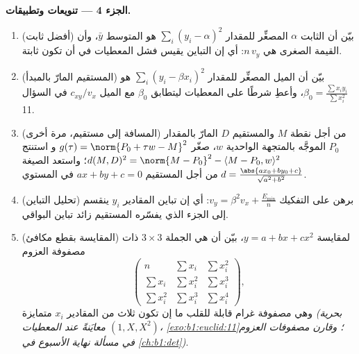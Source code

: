 \begin{problem}
\medskip
\noindent\textbf{الجزء 4 --- تنويعات وتطبيقات.}
\begin{enumerate}[resume]
  \item (أفضل ثابت) بيّن أن الثابت $\alpha$
        المصغِّر للمقدار $\sum_i (y_i - \alpha)^2$ هو المتوسط $\bar
        y$، وأن القيمة الصغرى هي $n\,v_y$: أي إن التباين
        يقيس فشل المعطيات في أن تكون ثابتة.
  \item (المستقيم المارّ بالمبدأ) بيّن أن الميل المصغِّر للمقدار
        $\sum_i (y_i - \beta x_i)^2$ هو $\beta_0 = \frac{\sum
        x_iy_i}{\sum x_i^2}$، وأعطِ شرطًا على المعطيات
        ليتطابق $\beta_0$ مع الميل
        $c_{xy}/v_x$ في السؤال 11.
  \item (المسافة إلى مستقيم، مرة أخرى) من أجل نقطة $M$ والمستقيم
        $D$ المارّ بالمقدار $P_0$ الموجَّه بالمتجهة الواحدية $w$،
        صغّر $g(\tau) = \norm{P_0 + \tau w - M}^2$ و
        استنتج $d(M, D)^2 = \norm{M - P_0}^2 - \langle M - P_0,
        w\rangle^2$؛ واستعد الصيغة $d = \frac{\abs{a x_0 +
        b y_0 + c}}{\sqrt{a^2 + b^2}}$ من أجل المستقيم $ax + by + c
        = 0$ في المستوي.
  \item (تحليل التباين) برهن على التفكيك $v_y =
        \beta^2 v_x + \frac{E_{\min}}n$: أي إن تباين
        المقادير $y_i$ ينقسم إلى الجزء الذي يفسّره المستقيم زائد
        تباين البواقي.
  \item (المقايسة بقطع مكافئ) لمقايسة $y = a + bx + cx^2$، بيّن أن
         هي الجملة $3 \times 3$ ذات
        مصفوفة العزوم
        \[
        \begin{pmatrix}
        n & \sum x_i & \sum x_i^2\\
        \sum x_i & \sum x_i^2 & \sum x_i^3\\
        \sum x_i^2 & \sum x_i^3 & \sum x_i^4
        \end{pmatrix},
        \]
        وهي مصفوفة غرام قابلة للقلب ما إن تكون ثلاث من
        المقادير $x_i$ متمايزة \emph{(بحرية $(1, X, X^2)$
        معايَنةً عند المعطيات، \cref{exo:b1:euclid:11}؛ وقارن
        مصفوفات العزوم في مسألة نهاية الأسبوع في
        \cref{ch:b1:det})}.
\end{enumerate}


\end{problem}
